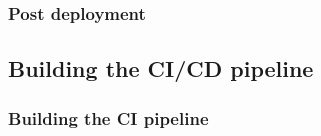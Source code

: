 




























































\subsubsection{
{Post deployment}}
\label{sec:Post deployment}

\subsection{
{Building the CI/CD pipeline}}
\label{sec:Bouwen van de CI/CD pipeline}

\subsubsection{
{Building the CI pipeline}}
\label{sec:Bouwen van de CI pipeline}

